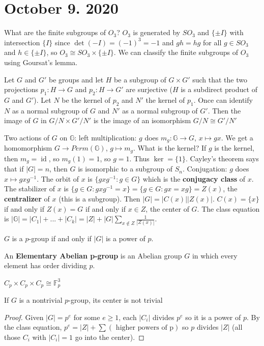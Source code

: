 \documentclass{article}
\newcommand{\vocab}[1]{\textbf{\color{blue!90}\boldmath #1}}
\newcommand{\ra}[1][]{\xrightarrow{#1}}
\DeclareMathOperator{\id}{id}
\begin{document}
\section{October 9. 2020}
What are the finite subgroups of $O_3$? $O_3$ is generated by $SO_3$ and $\{\pm I\}$ with intersection $\{I\}$ since $\det(-I)=(-1)^3=-1$ and $gh=hg$ for all $g\in SO_3$ and $h\in\{\pm I\}$, so $O_3\cong SO_3\times \{\pm I\}$. We can classify the finite subgroups of $O_3$ using Goursat's lemma.
\begin{lemma}
Let $G$ and $G'$ be groups and let $H$ be a subgroup of $G\times G'$ such that the two projections $p_1:H\ra G$ and $p_2:H\ra G'$ are surjective ($H$ is a subdirect product of $G$ and $G'$). Let $N$ be the kernel of $p_2$ and $N'$ the kernel of $p_1$. Once can identify $N$ as a normal subgroup of $G$ and $N'$ as a normal subgroup of $G'$. Then the image of $G$ in $G/N\times G'/N'$ is the image of an isomorphism $G/N\cong G'/N'$
\end{lemma}
Two actions of $G$ on $\mathbb{G}$: left multiplication: $g$ does $m_g:\mathbb{G}\ra G$, $x\mapsto gx$. We get a homomorphism $G\ra Perm(\mathbb{G})$, $g\mapsto m_g$. What is the kernel? If $g$ is the kernel, then $m_g=\id$, so $m_g(1)=1$, so $g=1$. Thus $\ker=\{1\}$. Cayley's theorem says that if $|G|=n$, then $G$ is isomorphic to a subgroup of $S_n$. Conjugation: $g$ does $x\mapsto gxg^{-1}$. The orbit of $x$ is $\{gxg^{-1}:g\in G\}$ which is the \vocab{conjugacy class} of $x$. The stabilizer of $x$ is $\{g\in G:gxg^{-1}=x\}=\{g\in G:gx=xg\}=Z(x)$, the \vocab{centralizer} of $x$ (this is a subgroup). Then $|G|=|C(x)||Z(x)|$. $C(x)=\{x\}$ if and only if $Z(x)=G$ if and only if $x\in Z$, the center of $G$. The class equation is $|\mathbb{G}|=|C_1|+...+|C_k|=|Z|+|G|\sum_{x\notin Z}\frac{1}{|Z(x)|}$.
\begin{definition}
$G$ is a $p$-group if and only if $|G|$ is a power of $p$.
\end{definition}
\begin{definition}
An \vocab{Elementary Abelian p-group} is an Abelian group $G$ in which every element has order dividing $p$.
\end{definition}
\begin{example}
$C_p\times C_p\times C_p\cong \mathbb{F}_p^3$
\end{example}
\begin{proposition}
If $G$ is a nontrivial $p$-group, its center is not trivial
\end{proposition}
\begin{proof}
Given $|G|=p^e$ for some $e\geq 1$, each $|C_i|$ divides $p^e$ so it is a power of $p$. By the class equation, $p^e=|Z|+\sum(\textrm{ higher powers of p})$ so $p$ divides $|Z|$ (all those $C_i$ with $|C_i|=1$ go into the center).
\end{proof}
\end{document}
